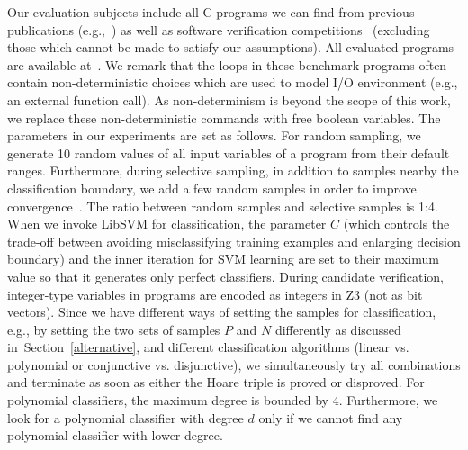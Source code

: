 Our evaluation subjects include all C programs we can find from previous publications (e.g.,~\cite{DBLP:conf/pldi/GulwaniSV08,sharma2012interpolants,gulavani2008automatically,jeannet2010interproc}) as well as software verification competitions~\cite{beyer:SVCOMP:2013,Dirk:SVCOMP:2016} (excluding those which cannot be made to satisfy our assumptions). All evaluated programs are available at~\cite{zilu:repo}. We remark that the loops in these benchmark programs often contain non-deterministic choices which are used to model I/O environment (e.g., an external function call). As non-determinism is beyond the scope of this work, we replace these non-deterministic commands with free boolean variables. The parameters in our experiments are set as follows. For random sampling, we generate 10 random values of all input variables of a program from their default ranges. Furthermore, during selective sampling, in addition to samples nearby the classification boundary, we add a few random samples in order to improve convergence~\cite{DBLP:conf/icml/SchohnC00}. The ratio between random samples and selective samples is 1:4. When we invoke LibSVM for classification, the parameter $C$ (which controls the trade-off between avoiding misclassifying training examples and enlarging decision boundary) and the inner iteration for SVM learning are set to their maximum value so that it generates only perfect classifiers. During candidate verification, integer-type variables in programs are encoded as integers in Z3 (not as bit vectors). Since we have different ways of setting the samples for classification, e.g., by setting the two sets of samples $P$ and $N$ differently as discussed in~Section~\ref{alternative}, and different classification algorithms (linear vs. polynomial or conjunctive vs. disjunctive), we simultaneously try all combinations and terminate as soon as either the Hoare triple is proved or disproved. For polynomial classifiers, the maximum degree is bounded by 4. Furthermore, we look for a polynomial classifier with degree $d$ only if we cannot find any polynomial classifier with lower degree.



